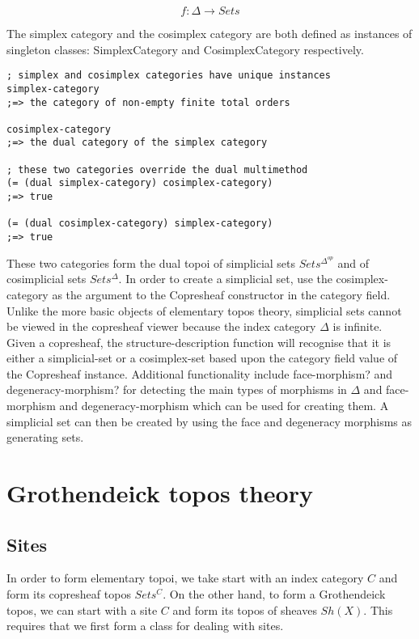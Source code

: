 \documentclass[a4paper,11pt]{report}
\begin{document}
\[ f : \Delta \to Sets \]

The simplex category and the cosimplex category are both defined as instances of singleton classes: SimplexCategory and CosimplexCategory respectively.

\begin{lstlisting}
; simplex and cosimplex categories have unique instances
simplex-category 
;=> the category of non-empty finite total orders

cosimplex-category 
;=> the dual category of the simplex category

; these two categories override the dual multimethod
(= (dual simplex-category) cosimplex-category)
;=> true

(= (dual cosimplex-category) simplex-category)
;=> true
\end{lstlisting}


These two categories form the dual topoi of simplicial sets $Sets^{\Delta^{op}}$ and of cosimplicial sets $Sets^{\Delta}$. In order to create a simplicial set, use the cosimplex-category as the argument to the Copresheaf constructor in the category field. Unlike the more basic objects of elementary topos theory, simplicial sets cannot be viewed in the copresheaf viewer because the index category $\Delta$ is infinite. \\

Given a copresheaf, the structure-description function will recognise that it is either a simplicial-set or a cosimplex-set based upon the category field value of the Copresheaf instance. Additional functionality include face-morphism? and degeneracy-morphism? for detecting the main types of morphisms in $\Delta$ and face-morphism and degeneracy-morphism which can be used for creating them. A simplicial set can then be created by using the face and degeneracy morphisms as generating sets.

\newpage 

\chapter{Grothendeick topos theory}

\section{Sites}
In order to form elementary topoi, we take start with an index category $C$ and form its copresheaf topos $Sets^C$. On the other hand, to form a Grothendeick topos, we can start with a site $C$ and form its topos of sheaves $Sh(X)$. This requires that we first form a class for dealing with sites. \\ 
\end{document}

